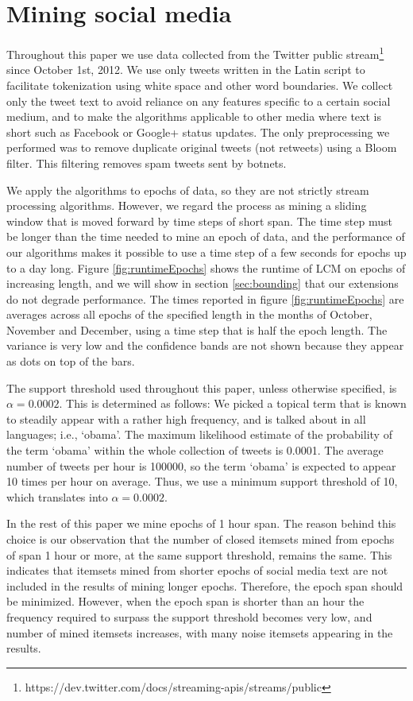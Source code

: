 \documentclass{sig-alternate}
\begin{document}
\section{Mining social media}
\label{sec:socmine}

Throughout this paper we use data collected from the Twitter public
stream\footnote{https://dev.twitter.com/docs/streaming-apis/streams/public}
since October 1st, 2012. 
We use only tweets written in the Latin script to facilitate tokenization
using white space and other word boundaries.
We collect only the tweet text to avoid reliance on any features specific to a
certain social medium,
and to make the algorithms applicable to other media where text is short such
as Facebook or Google+ status updates.
The only preprocessing we performed was to remove duplicate original tweets
(not retweets) using a Bloom filter.
This filtering removes spam tweets sent by botnets.

We apply the algorithms to epochs of data, so they are not strictly stream
processing algorithms.
However, we regard the process as mining a sliding window that is moved
forward by time steps of short span.
The time step must be longer than the time needed to mine an epoch of data,
and the performance of our algorithms makes it possible to use a time step
of a few seconds for epochs up to a day long.
Figure \ref{fig:runtimeEpochs} shows the runtime of LCM on epochs of
increasing length, and we will show in section \ref{sec:bounding} that our
extensions do not degrade performance.
The times reported in figure \ref{fig:runtimeEpochs} are averages across all
epochs of the specified length in the months of October, November and December,
using a time step that is half the epoch length.
The variance is very low and the confidence bands are not shown because they
appear as dots on top of the bars. 

The support threshold used throughout this paper, unless otherwise specified,
is $\alpha=0.0002$.
This is determined as follows: We picked a topical term that is known to
steadily appear with a rather high frequency, and is talked about in all
languages; i.e., `obama'.
The maximum likelihood estimate of the probability of the term `obama' within
the whole collection of tweets is 0.0001.
The average number of tweets per hour is 100000, so the term `obama' is
expected to appear 10 times per hour on average.
Thus, we use a minimum support threshold of 10, which translates into
$\alpha = 0.0002$.

In the rest of this paper we mine epochs of 1 hour span.
The reason behind this choice is our observation that the number of closed
itemsets mined from epochs of span 1 hour or more,
at the same support threshold, remains the same.
This indicates that itemsets mined from shorter epochs of social media text
are not included in the results of mining longer epochs. 
Therefore, the epoch span should be minimized.
However, when the epoch span is shorter than an hour the frequency required
to surpass the support threshold becomes very low,
and number of mined itemsets increases, with many noise itemsets appearing in
the results.
\end{document}
